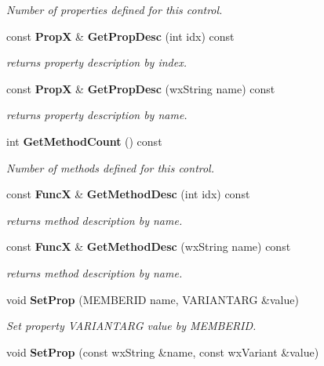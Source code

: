 \begin{CompactItemize}
\begin{CompactList}\small\item\em Number of properties defined for this control.\item\end{CompactList}\item 
const {\bf Prop\-X} \& {\bf Get\-Prop\-Desc} (int idx) const
\begin{CompactList}\small\item\em returns property description by index.\item\end{CompactList}\item 
const {\bf Prop\-X} \& {\bf Get\-Prop\-Desc} (wx\-String name) const
\begin{CompactList}\small\item\em returns property description by name.\item\end{CompactList}\item 
{}
int {\bf Get\-Method\-Count} () const\label{classwxActiveX_a8}

\begin{CompactList}\small\item\em Number of methods defined for this control.\item\end{CompactList}\item 
const {\bf Func\-X} \& {\bf Get\-Method\-Desc} (int idx) const
\begin{CompactList}\small\item\em returns method description by name.\item\end{CompactList}\item 
const {\bf Func\-X} \& {\bf Get\-Method\-Desc} (wx\-String name) const
\begin{CompactList}\small\item\em returns method description by name.\item\end{CompactList}\item 
{}
void {\bf Set\-Prop} (MEMBERID name, VARIANTARG \&value)\label{classwxActiveX_a11}

\begin{CompactList}\small\item\em Set property VARIANTARG value by MEMBERID.\item\end{CompactList}\item 
{}
void {\bf Set\-Prop} (const wx\-String \&name, const wx\-Variant \&value)\label{classwxActiveX_a12}


\end{CompactItemize}
